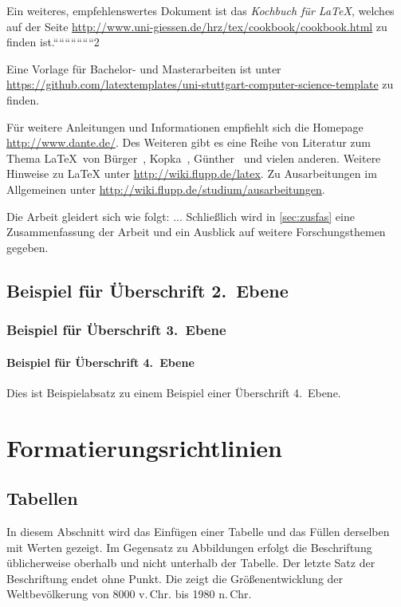 \documentclass[runningheads,a4paper]{llncs}[2015/06/24]
\begin{document}
Ein weiteres, empfehlenswertes Dokument ist das \emph{Kochbuch für \LaTeX{}}, welches auf der Seite \url{http://www.uni-giessen.de/hrz/tex/cookbook/cookbook.html} zu finden ist.``````````````2

Eine Vorlage für Bachelor- und Masterarbeiten ist unter \url{https://github.com/latextemplates/uni-stuttgart-computer-science-template} zu finden.

Für weitere Anleitungen und Informationen empfiehlt sich die Homepage \url{http://www.dante.de/}.
Des Weiteren gibt es eine Reihe von Literatur zum Thema \LaTeX\ von Bürger~\cite{buerger}, Kopka~\cite{kopka}, Günther~\cite{guenther} und vielen anderen.
Weitere Hinweise zu \LaTeX{} unter \url{http://wiki.flupp.de/latex}.
Zu Ausarbeitungen im Allgemeinen unter \url{http://wiki.flupp.de/studium/ausarbeitungen}.

Die Arbeit gleidert sich wie folgt:
...
Schließlich wird in \cref{sec:zusfas} eine Zusammenfassung der Arbeit und ein Ausblick auf weitere Forschungsthemen gegeben.

\subsection{Beispiel für Überschrift 2.~Ebene}

\subsubsection{Beispiel für Überschrift 3.~Ebene}

\paragraph{Beispiel für Überschrift 4.~Ebene}
Dies ist Beispielabsatz zu einem Beispiel einer Überschrift 4.~Ebene.

\section{Formatierungsrichtlinien}

\subsection{Tabellen}
In diesem Abschnitt wird das Einfügen einer Tabelle und das Füllen derselben mit Werten gezeigt.
Im Gegensatz zu Abbildungen erfolgt die Beschriftung üblicherweise oberhalb und nicht unterhalb der Tabelle.
Der letzte Satz der Beschriftung endet ohne Punkt.
Die  zeigt die Größenentwicklung der Weltbevölkerung von 8000 v.\,Chr. bis 1980 n.\,Chr.
\end{document}
